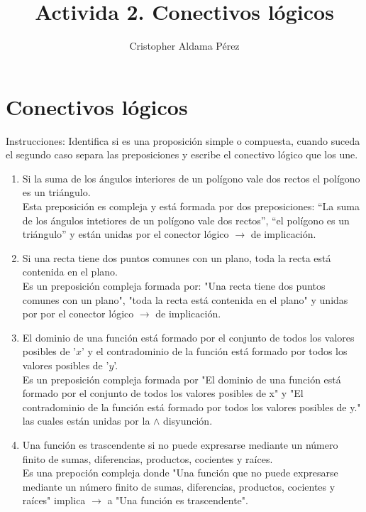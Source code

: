 \documentclass[a4paper,10pt]{article}
\title{Activida 2. Conectivos lógicos}
\author{Cristopher Aldama Pérez}
\begin{document}
\maketitle

\section{Conectivos lógicos}
Instrucciones: Identifica si es una proposición simple o compuesta, cuando suceda el segundo caso separa las preposiciones y escribe el conectivo lógico que los une.

\begin{enumerate}
\item Si la suma de los ángulos interiores de un polígono vale dos rectos el polígono es un triángulo.\\
  Esta preposición es compleja y está formada por dos preposiciones: ``La suma de los ángulos intetiores de un polígono vale dos rectos'', ``el polígono es un triángulo'' y están unidas por el conector lógico \(\to\) de implicación.

\item Si una recta tiene dos puntos comunes con un plano, toda la recta está contenida 
en el plano.\\
Es un preposición compleja formada por: "Una recta tiene dos puntos comunes con un plano", "toda la recta está contenida en el plano" y unidas por por el conector lógico \(\to\) de implicación.

\item El  dominio  de  una  función  está  formado  por  el  conjunto  de  todos  los  valores posibles de '\(x\)' y el  contradominio de la función está formado por todos los valores posibles de '\(y\)'.\\
Es un preposición compleja formada por "El  dominio  de  una  función  está  formado  por  el  conjunto  de  todos  los  valores posibles de x" y "El  contradominio de la función está formado por todos los valores posibles de y." las cuales están unidas por la \( \land \) disyunción.

\item Una función es trascendente si no puede expresarse mediante un número finito de sumas, diferencias, productos, cocientes y raíces.\\
Es una prepoción compleja donde "Una función que no puede expresarse mediante un número finito de sumas, diferencias, productos, cocientes y raíces" implica \(\to\) a "Una función es trascendente".

\end{enumerate}
 
\end{document}
